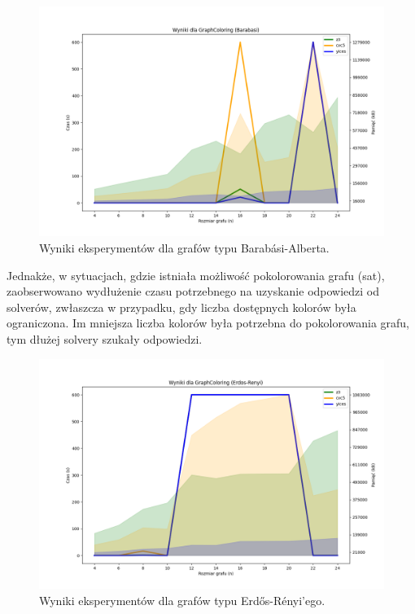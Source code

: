 \begin{figure}[htbp]
	\centering
	\begin{minipage}{\textwidth}
		\includegraphics[width=\textwidth]{./figures/6-barabasi-plot.png}
		\caption{Wyniki eksperymentów dla grafów typu Barabási-Alberta.}
		\label{fig:6-barabasi-plot}
	\end{minipage}
\end{figure}

Jednakże, w sytuacjach, gdzie istniała możliwość pokolorowania grafu (sat), zaobserwowano wydłużenie czasu potrzebnego na uzyskanie odpowiedzi od solverów, zwłaszcza w przypadku, gdy liczba dostępnych kolorów była ograniczona. Im mniejsza liczba kolorów była potrzebna do pokolorowania grafu, tym dłużej solvery szukały odpowiedzi.

\begin{figure}[htbp]
	\centering
	\begin{minipage}{\textwidth}
		\includegraphics[width=\textwidth]{./figures/6-erdos-renyi-plot.png}
		\caption{Wyniki eksperymentów dla grafów typu Erdős-Rényi'ego.}
		\label{fig:6-erdos-renyi-plot}
	\end{minipage}
\end{figure}

